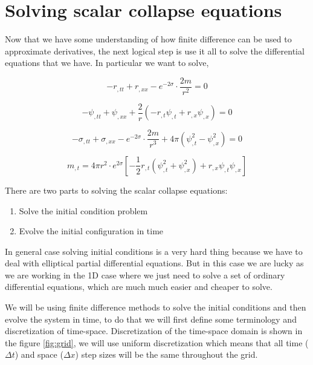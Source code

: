 
\section{Solving scalar collapse equations}

Now that we have some understanding of how finite difference can be used to approximate derivatives, the next logical step is use it all to solve the differential equations that we have. In particular we want to solve,

\begin{equation}
    -r_{, t t}+r_{, x x}-e^{-2 \sigma} \cdot \frac{2 m}{r^{2}}=0
    \label{eqn:r_chap3}
\end{equation}

\begin{equation}
    -\psi_{, t t}+\psi_{, x x}+\frac{2}{r}\left(-r_{, t} \psi_{, t}+r_{, x} \psi_{, x}\right)=0
    \label{eqn:psi_chap3}
\end{equation}

\begin{equation}
    -\sigma_{, t t}+\sigma_{, x x}-e^{-2 \sigma} \cdot \frac{2 m}{r^{3}}+4 \pi\left(\psi_{, t}^{2}-\psi_{, x}^{2}\right)=0
    \label{eqn:sigma_chap3}
\end{equation}

\begin{equation}
    m_{, t}=4 \pi r^{2} \cdot e^{2 \sigma}\left[-\frac{1}{2} r_{, t}\left(\psi_{, t}^{2}+\psi_{, x}^{2}\right)+r_{, x} \psi_{, t} \psi_{, x}\right]
    \label{eqn:m_chap3}
\end{equation}

There are two parts to solving the scalar collapse equations:
\begin{enumerate}
    \item Solve the initial condition problem
    \item Evolve the initial configuration in time
\end{enumerate}

In general case solving initial conditions is a very hard thing because we have to deal with elliptical partial differential equations. But in this case we are lucky as we are working in the 1D case where we just need to solve a set of ordinary differential equations, which are much much easier and cheaper to solve.

We will be using finite difference methods to solve the initial conditions and then evolve the system in time, to do that we will first define some terminology and discretization of time-space.  Discretization of the time-space domain is shown in the figure \ref{fig:grid}, we will use uniform discretization which means that all time ($\Delta t$) and space ($\Delta x$) step sizes will be the same throughout the grid.



